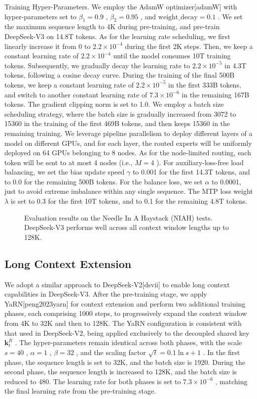 \documentclass[11pt,a4paper]{article}
\begin{document}
Training Hyper-Parameters. We employ the AdamW optimizer[adamW] with hyper-parameters set to  $\beta_1=0.9$ ,  $\beta_2=0.95$ , and  $\mathrm{weight\_decay}=0.1$ . We set the maximum sequence length to 4K during pre-training, and pre-train DeepSeek-V3 on 14.8T tokens. As for the learning rate scheduling, we first linearly increase it from 0 to  $2.2 \times 10^{-4}$  during the first 2K steps. Then, we keep a constant learning rate of  $2.2 \times 10^{-4}$  until the model consumes 10T training tokens. Subsequently, we gradually decay the learning rate to  $2.2 \times 10^{-5}$  in 4.3T tokens, following a cosine decay curve. During the training of the final 500B tokens, we keep a constant learning rate of  $2.2 \times 10^{-5}$  in the first 333B tokens, and switch to another constant learning rate of  $7.3 \times 10^{-6}$  in the remaining 167B tokens. The gradient clipping norm is set to 1.0. We employ a batch size scheduling strategy, where the batch size is gradually increased from 3072 to 15360 in the training of the first 469B tokens, and then keeps 15360 in the remaining training. We leverage pipeline parallelism to deploy different layers of a model on different GPUs, and for each layer, the routed experts will be uniformly deployed on 64 GPUs belonging to 8 nodes. As for the node-limited routing, each token will be sent to at most 4 nodes (i.e.,  $M=4$ ). For auxiliary-loss-free load balancing, we set the bias update speed  $\gamma$  to 0.001 for the first 14.3T tokens, and to 0.0 for the remaining 500B tokens. For the balance loss, we set  $\alpha$  to 0.0001, just to avoid extreme imbalance within any single sequence. The MTP loss weight  $\lambda$  is set to 0.3 for the first 10T tokens, and to 0.1 for the remaining 4.8T tokens.

\begin{figure}[h]
\caption{Evaluation results on the Needle In A Haystack (NIAH) tests. DeepSeek-V3 performs well across all context window lengths up to 128K.}
\end{figure}

\subsection{Long Context Extension}

We adopt a similar approach to DeepSeek-V2[dsvii] to enable long context capabilities in DeepSeek-V3. After the pre-training stage, we apply YaRN[peng2023yarn] for context extension and perform two additional training phases, each comprising 1000 steps, to progressively expand the context window from 4K to 32K and then to 128K. The YaRN configuration is consistent with that used in DeepSeek-V2, being applied exclusively to the decoupled shared key  $\mathbf{k}^R_t$ . The hyper-parameters remain identical across both phases, with the scale  $s = 40$ ,  $\alpha = 1$ ,  $\beta = 32$ , and the scaling factor  $\sqrt{t} = 0.1 \ln{s} + 1$ . In the first phase, the sequence length is set to 32K, and the batch size is 1920. During the second phase, the sequence length is increased to 128K, and the batch size is reduced to 480. The learning rate for both phases is set to  $7.3 \times 10^{-6}$ , matching the final learning rate from the pre-training stage.
\end{document}
